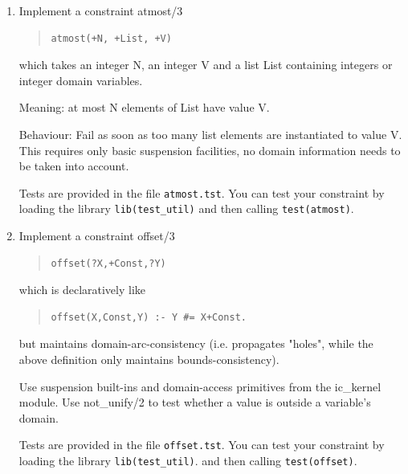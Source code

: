 \begin{enumerate}

\item Implement a constraint atmost/3 
\begin{quote}\begin{verbatim}
atmost(+N, +List, +V)
\end{verbatim}\end{quote}
   which takes an integer N, an integer V and a list List
   containing integers or integer domain variables.

   Meaning: at most N elements of List have value V.

   Behaviour: Fail as soon as too many list elements are
   instantiated to value V.
   This requires only basic suspension facilities, no domain
   information needs to be taken into account.

   Tests are provided in the file {\tt atmost.tst}.
   You can test your constraint by loading the library {\tt lib(test_util)}
   and then calling {\tt test(atmost)}.


\item Implement a constraint offset/3

\begin{quote}\begin{verbatim}
offset(?X,+Const,?Y)
\end{verbatim}\end{quote}
which is declaratively like
\begin{quote}\begin{verbatim}
offset(X,Const,Y) :- Y #= X+Const.
\end{verbatim}\end{quote}
  but maintains domain-arc-consistency (i.e. propagates
  "holes", while the above definition only maintains
  bounds-consistency).

  Use suspension built-ins and domain-access primitives
  from the ic_kernel module.
  Use not_unify/2 to test whether a value is outside
  a variable's domain.

   Tests are provided in the file {\tt offset.tst}.
   You can test your constraint by loading the library {\tt lib(test_util)}.
   and then calling {\tt test(offset)}.

\end{enumerate}

